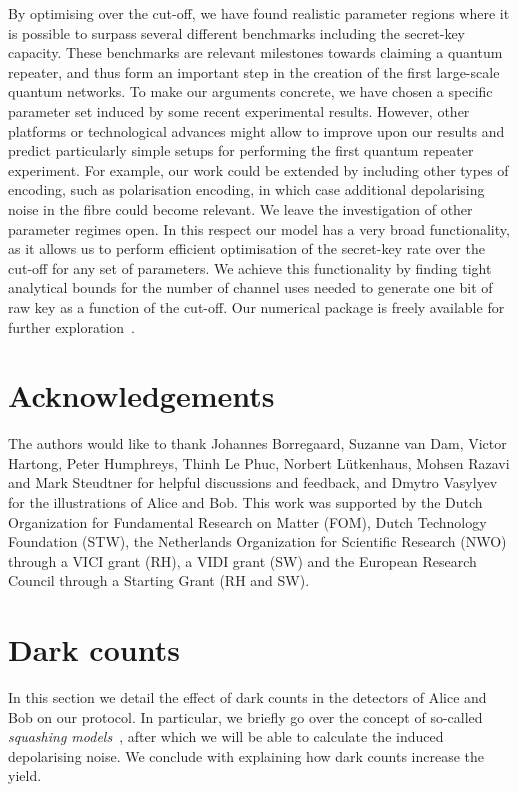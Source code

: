 \documentclass[aps,pra,reprint,superscriptaddress]{revtex4-1}
\begin{document}
By optimising over the cut-off, we have found realistic parameter regions where it is possible to surpass several different benchmarks including the secret-key capacity. These benchmarks are relevant milestones towards claiming a quantum repeater, and thus form an important step in the creation of the first large-scale quantum networks. 
To make our arguments concrete, we have chosen a specific parameter set induced by some recent experimental results. However, other platforms or technological advances might allow to improve upon our results and predict particularly simple setups for performing the first quantum repeater experiment. For example, our work could be extended by including other types of encoding, such as polarisation encoding, in which case additional depolarising noise in the fibre could become relevant. We leave the investigation of other parameter regimes open. In this respect our model has a very broad functionality, as it allows us to perform efficient optimisation of the secret-key rate over the cut-off for any set of parameters. We achieve this functionality by finding tight analytical bounds for the number of channel uses needed to generate one bit of raw key as a function of the cut-off. Our numerical package is freely available for further exploration~\cite{Note1}.

\section{Acknowledgements}
\vspace{-2mm}
 The authors would like to thank Johannes Borregaard, Suzanne van Dam, Victor Hartong, Peter Humphreys, Thinh Le Phuc, Norbert L{\"u}tkenhaus, Mohsen Razavi and Mark Steudtner for helpful discussions and feedback, and Dmytro Vasylyev for the illustrations of Alice and Bob. This work was supported by the Dutch Organization for Fundamental Research on Matter (FOM), Dutch Technology Foundation (STW), the Netherlands Organization for Scientific Research (NWO) through a VICI grant (RH), a VIDI grant (SW) and the European Research Council through a Starting Grant (RH and SW).

\clearpage

\vspace{5mm}
	      
       {}
\onecolumngrid
\appendix
\section{Dark counts}
\label{sec:darkcounts}
In this section we detail the effect of dark counts in the detectors of Alice and Bob on our protocol. In particular, we briefly go over the concept of so-called \emph{squashing models}~\cite{gittsovich2014squashing,beaudry2008squashing}, after which we will be able to calculate the induced depolarising noise. We conclude with explaining how dark counts increase the yield.
\end{document}
